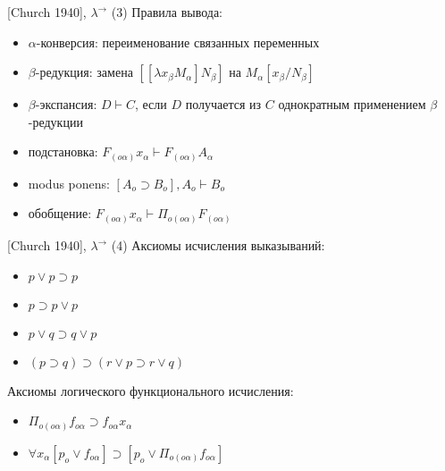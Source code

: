 \documentclass{beamer}
\begin{document}
\begin{frame}{[Church 1940], $\lambda^\to$ (3)}
Правила вывода:\\
\bigskip
\begin{itemize}
  \item $\alpha$-конверсия: переименование связанных переменных
  \item $\beta$-редукция: замена $[[\lambda x_\beta M_\alpha] N_\beta]$ на $M_\alpha[x_\beta/N_\beta]$
  \item $\beta$-экспансия: $D \vdash C$, если $D$ получается из $C$ однократным применением $\beta$-редукции
  \item подстановка: $F_{(o \alpha)} x_\alpha \vdash F_{(o \alpha)} A_\alpha$
  \item modus ponens: $[A_o \supset B_o], A_o \vdash B_o$ 
  \item обобщение: $F_{(o \alpha)} x_\alpha \vdash \Pi_{o (o \alpha)} F_{(o \alpha)}$
\end{itemize}
\end{frame}

\begin{frame}{[Church 1940], $\lambda^\to$ (4)}
Аксиомы исчисления выказываний:\\
\begin{itemize}
  \item $p \vee p \supset p$
  \item $p \supset p \vee p$
  \item $p \vee q \supset q \vee p$
  \item $(p \supset q) \supset (r \vee p \supset r \vee q)$
\end{itemize}
\bigskip
Аксиомы логического функционального исчисления:\\
\begin{itemize}
  \item $\Pi_{o (o \alpha)} f_{o \alpha} \supset f_{o \alpha} x_\alpha$
  \item $\forall x_\alpha [p_o \vee f_{o \alpha}] \supset [p_o \vee \Pi_{o(o \alpha)} f_{o \alpha}]$
\end{itemize}
\end{frame}
\end{document}
